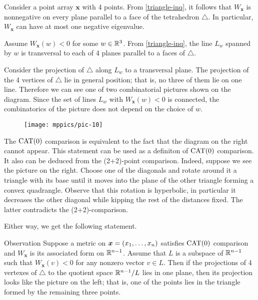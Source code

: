 \documentclass{article}
\begin{document}
Consider a point array $\bm{x}$ with 4 points.
From \ref{triangle-inq}, 
it follows that $W_{\bm{x}}$ 
is nonnegative on every plane parallel to a face of the tetrahedron $\triangle$.
In particular, $W_{\bm{x}}$ can have at most one negative eigenvalue.

Assume $W_{\bm{x}}(w)<0$ for some $w\in\mathbb{R}^3$.
From \ref{triangle-inq}, the line $L_w$ spanned by
$w$ is transversal to each of 4 planes parallel to a faces of $\triangle$.

Consider the projection of $\triangle$ along $L_w$ to a transversal plane. 
The projection of the 4 vertices of $\triangle$ lie in general position; 
that is, no three of them lie on one line.
Therefore  we can see one of two combinatorial pictures shown on the diagram.
Since the set of lines $L_w$ with $W_{\bm{x}}(w)<0$ is connected,
the combinatorics of the picture does not depend on the choice of $w$.

\begin{wrapfigure}{r}{33mm}
\vskip-2mm
\centering
\texttt{[image: mppics/pic-10]}
\end{wrapfigure}

The $\mathrm{CAT}(0)$ comparison is equivalent to the fact that the diagram on the right cannot appear.
This statement can be used as a definiton of $\mathrm{CAT}(0)$ comparison.
It also can be deduced from the (2+2)-point comparison.
Indeed, suppose we see the picture on the right.
Choose one of the diagonals and rotate  around it a triangle with its base until it moves into the plane of the other triangle forming a convex quadrangle.
Observe that this rotation is hyperbolic, in particular it decreases the other diagonal while kipping the rest of the distances fixed.
The latter contradicts the (2+2)-comparison.


Either way, we get the following statement.


\begin{thm}{Observation}\label{cat0-proj}
Suppose a metric on $\bm{x}\z=(x_1,\dots,x_n)$ satisfies $\mathrm{CAT}(0)$ comparison
and $W_{\bm{x}}$ is its associated form on $\mathbb{R}^{n-1}$.
Assume that $L$ is a subspace of $\mathbb{R}^{n-1}$ such that
$W_{\bm{x}}(v)< 0$ for any nonzero vector $v\in L$.
Then if the projections of 4 vertexes of $\triangle$ to the quotient space $\mathbb{R}^{n-1}/L$ lies in one plane, then its projection looks like the picture on the left;
that is, one of the points lies in the triangle formed by the remaining three points.
\end{thm}
\end{document}
